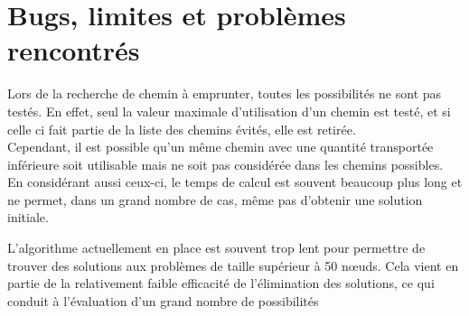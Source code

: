 \documentclass[a4paper, 12pt]{report}
\begin{document}
\section{Bugs, limites et problèmes rencontrés}
Lors de la recherche de chemin à emprunter, toutes les possibilités ne sont pas testés.
En effet, seul la valeur maximale d'utilisation d'un chemin est testé, 
et si celle ci fait partie de la liste des chemins évités, elle est retirée. \\
Cependant, il est possible qu'un même chemin avec une quantité transportée inférieure
soit utilisable mais ne soit pas considérée dans les chemins possibles.\\
En considérant aussi ceux-ci, le temps de calcul est souvent beaucoup plus long et ne permet,
dans un grand nombre de cas, même pas d'obtenir une solution initiale. \\ \hbox{}

L'algorithme actuellement en place est souvent trop lent pour permettre de trouver des solutions 
aux problèmes de taille supérieur à 50 nœuds. 
Cela vient en partie de la relativement faible efficacité de l'élimination des solutions, 
ce qui conduit à l'évaluation d'un grand nombre de possibilités
\end{document}
